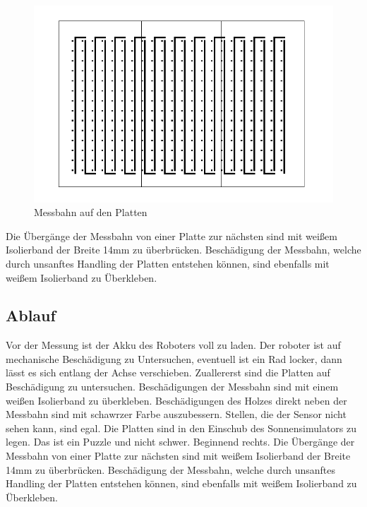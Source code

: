 \documentclass[a4paper,bibtotoc,oneside]{scrbook}
\begin{document}
\begin{figure}[htbp]
\centering
\includegraphics[width=125mm]{img/messbahn1.png}
\caption[Messbahn auf den Platten]{Messbahn auf den Platten}\label{bahn}
\end{figure}
Die Übergänge der Messbahn von einer Platte zur nächsten sind mit weißem Isolierband  der Breite 14mm zu überbrücken. Beschädigung der Messbahn, welche durch unsanftes Handling der Platten entstehen können, sind ebenfalls mit weißem Isolierband zu Überkleben.





\subsection{Ablauf}\thispagestyle{empty}
Vor der Messung ist der Akku des Roboters voll zu laden. Der roboter ist auf mechanische Beschädigung zu Untersuchen, eventuell ist ein Rad locker, dann lässt es sich entlang der Achse verschieben.
Zuallererst sind die Platten auf Beschädigung zu untersuchen. Beschädigungen der Messbahn sind mit einem weißen Isolierband zu überkleben. Beschädigungen des Holzes direkt neben der Messbahn sind mit schawrzer Farbe auszubessern. Stellen, die der Sensor nicht sehen kann, sind egal.
Die Platten sind in den Einschub des Sonnensimulators zu legen. Das ist ein Puzzle und nicht schwer. Beginnend rechts. Die Übergänge der Messbahn von einer Platte zur nächsten sind mit weißem Isolierband  der Breite 14mm zu überbrücken. Beschädigung der Messbahn, welche durch unsanftes Handling der Platten entstehen können, sind ebenfalls mit weißem Isolierband zu Überkleben.
\end{document}
